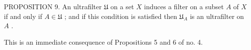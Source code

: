 PROPOSITION 9. An ultrafilter \(\mathfrak{U}\) on a set \(X\) induces a filter on a subset \(A\) of \(X\) if and only if \(A \in \mathfrak{U}\) ; and if this condition is satisfied then \(\mathfrak{U}_A\) is an ultrafilter on \(A\) .

This is an immediate consequence of Propositions 5 and 6 of no. 4.

